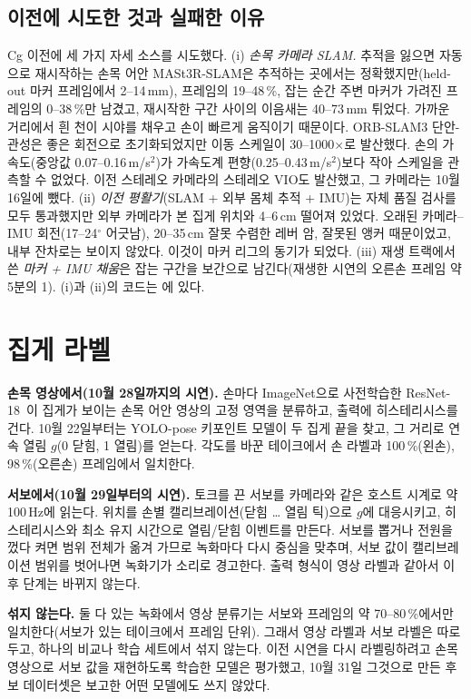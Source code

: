 \documentclass[conference,10pt]{IEEEtran}
\newcommand{\mm}{\,mm\xspace}
\begin{document}
\subsection{이전에 시도한 것과 실패한 이유}\label{sec:slam}
Cg 이전에 세 가지 자세 소스를 시도했다. (i) \emph{손목 카메라 SLAM.} 추적을 잃으면 자동으로 재시작하는 손목 어안 MASt3R-SLAM은
추적하는 곳에서는 정확했지만(held-out 마커 프레임에서 2--14\mm), 프레임의 19--48\,\%, 잡는 순간 주변 마커가 가려진 프레임의
0--38\,\%만 남겼고, 재시작한 구간 사이의 이음새는 40--73\mm 튀었다. 가까운 거리에서 흰 천이 시야를 채우고 손이 빠르게 움직이기
때문이다. ORB-SLAM3 단안-관성은 좋은 회전으로 초기화되었지만 이동 스케일이 30--1000$\times$로 발산했다. 손의 가속도(중앙값
0.07--0.16\,m/s$^2$)가 가속도계 편향(0.25--0.43\,m/s$^2$)보다 작아 스케일을 관측할 수 없었다. 이전 스테레오 카메라의 스테레오
VIO도 발산했고, 그 카메라는 10월 16일에 뺐다. (ii) \emph{이전 평활기}(SLAM + 외부 몸체 추적 + IMU)는 자체 품질 검사를 모두
통과했지만 외부 카메라가 본 집게 위치와 4--6\,cm 떨어져 있었다. 오래된 카메라--IMU 회전(17--24$^\circ$ 어긋남), 20--35\,cm
잘못 수렴한 레버 암, 잘못된 앵커 때문이었고, 내부 잔차로는 보이지 않았다. 이것이 마커 리그의 동기가 되었다. (iii) 재생 트랙에서
쓴 \emph{마커 + IMU 채움}은 잡는 구간을 보간으로 남긴다(재생한 시연의 오른손 프레임 약 5분의 1). (i)과 (ii)의 코드는
에 있다.

\section{집게 라벨}\label{sec:jaw}
\textbf{손목 영상에서(10월 28일까지의 시연).} 손마다 ImageNet으로 사전학습한 ResNet-18~\cite{he2016resnet}이 집게가 보이는 손목
어안 영상의 고정 영역을 분류하고, 출력에 히스테리시스를 건다. 10월 22일부터는 YOLO-pose 키포인트 모델이 두 집게 끝을 찾고, 그
거리로 연속 열림 $g$(0 닫힘, 1 열림)를 얻는다. 각도를 바꾼 테이크에서 손 라벨과 100\,\%(왼손), 98\,\%(오른손) 프레임에서 일치한다.

\textbf{서보에서(10월 29일부터의 시연).} 토크를 끈 서보를 카메라와 같은 호스트 시계로 약 100\,Hz에 읽는다. 위치를 손별
캘리브레이션(닫힘 \ldots{} 열림 틱)으로 $g$에 대응시키고, 히스테리시스와 최소 유지 시간으로 열림/닫힘 이벤트를 만든다. 서보를
뽑거나 전원을 껐다 켜면 범위 전체가 옮겨 가므로 녹화마다 다시 중심을 맞추며, 서보 값이 캘리브레이션 범위를 벗어나면 녹화기가
소리로 경고한다. 출력 형식이 영상 라벨과 같아서 이후 단계는 바뀌지 않는다.

\textbf{섞지 않는다.} 둘 다 있는 녹화에서 영상 분류기는 서보와 프레임의 약 70--80\,\%에서만 일치한다(서보가 있는 테이크에서 프레임 단위). 그래서 영상 라벨과 서보 라벨은
따로 두고, 하나의 비교나 학습 세트에서 섞지 않는다. 이전 시연을 다시 라벨링하려고 손목 영상으로 서보 값을 재현하도록 학습한
모델은 평가했고, 10월 31일 그것으로 만든 후보 데이터셋은 보고한 어떤 모델에도 쓰지 않았다.
\end{document}
